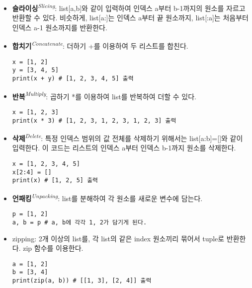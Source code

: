 \begin{itemize}
    \item \textbf{슬라이싱}\textit{\textsuperscript{Slicing}}: list{[}a,b{]}와 같이 입력하여 인덱스 a부터 b-1까지의 원소를 자르고 반환할 수 있다. 비슷하게, list{[}a:{]}는 인덱스 a부터 끝 원소까지, list{[}:a{]}는 처음부터 인덱스 a-1 원소까지를 반환한다.
    \item \textbf{합치기}\textit{\textsuperscript{Concatenate}}: 더하기 +를 이용하여 두 리스트를 합친다.
\begin{tcolorbox}[colframe=black, colback=white]
    \begin{verbatim}
x = [1, 2]
y = [3, 4, 5]
print(x + y) # [1, 2, 3, 4, 5] 출력
    \end{verbatim}
    \end{tcolorbox}
    \item \textbf{반복}\textit{\textsuperscript{Multiply}}: 곱하기 *를 이용하여 list를 반복하여 더할 수 있다.
\begin{tcolorbox}[colframe=black, colback=white]
    \begin{verbatim}
x = [1, 2, 3]
print(x * 3) # [1, 2, 3, 1, 2, 3, 1, 2, 3] 출력
    \end{verbatim}
    \end{tcolorbox}
    \item \textbf{삭제}\textit{\textsuperscript{Delete}}: 특정 인덱스 범위의 값 전체를 삭제하기 위해서는 list{[}a:b{]}={[}{]}와 같이 입력한다. 이 코드는 리스트의 인덱스 a부터 인덱스 b-1까지 원소를 삭제한다.
\begin{tcolorbox}[colframe=black, colback=white]
    \begin{verbatim}
x = [1, 2, 3, 4, 5]
x[2:4] = []
print(x) # [1, 2, 5] 출력
    \end{verbatim}
    \end{tcolorbox}
    \item \textbf{언패킹}\textit{\textsuperscript{Unpacking}}: list를 분해하여 각 원소를 새로운 변수에 담는다.
    \begin{tcolorbox}[colframe=black, colback=white]
    \begin{verbatim}
p = [1, 2]
a, b = p # a, b에 각각 1, 2가 담기게 된다.
    \end{verbatim}
    \end{tcolorbox}
    \item zipping: 2개 이상의 list를, 각 list의 같은 index 원소끼리 묶어서 tuple로 반환한다. zip 함수를 이용한다.
        \begin{tcolorbox}[colframe=black, colback=white]
    \begin{verbatim}
a = [1, 2]
b = [3, 4]
print(zip(a, b)) # [[1, 3], [2, 4]] 출력
    \end{verbatim}
    \end{tcolorbox}
\end{itemize}

